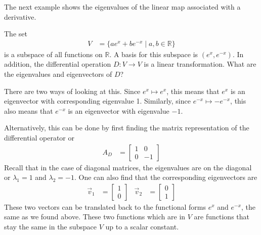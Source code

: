 The next example shows the eigenvalues of the linear map associated with a derivative.  

\begin{example}
The set 
%
\begin{align*}
V & = \{ ae^{x} + b e^{-x} \; | \; a,b \in \mathbb{R} \}
\end{align*}
is a subspace of all functions on $\mathbb{R}$.  A basis for this subspace is $(e^x,e^{-x})$.  In addition, the differential operation $D:V \rightarrow V$ is a linear transformation.   What are the eigenvalues and eigenvectors of $D$?  

\solution

There are two ways of looking at this.  Since $e^{x} \mapsto e^x$, this means that $e^x$ is an eigenvector with corresponding eigenvalue 1.  Similarly, since $e^{-x} \mapsto -e^{-x}$, this also means that $e^{-x}$ is an eigenvector with eigenvalue $-1$.  

Alternatively, this can be done by first finding the matrix representation of the differential operator or
%
\begin{align*}
A_D & = \begin{bmatrix}
1 & 0 \\
0 & -1 
\end{bmatrix}
\end{align*}
Recall that in the case of diagonal matrices, the eigenvalues are on the diagonal or $\lambda_1=1$ and $\lambda_2=-1$.  One can also find that the corresponding eigenvectors are 
%
\begin{align*}
\vec{v}_1 & = \begin{bmatrix}
1 \\ 0 
\end{bmatrix} & \vec{v}_2 & = \begin{bmatrix}
0 \\ 1 
\end{bmatrix}
\end{align*}
These two vectors can be translated back to the functional forms $e^{x}$ and $e^{-x}
$, the same as we found above.  These two functions which are in $V$ are functions that stay the same in the subspace $V$ up to a scalar constant.  


\end{example}

\vspace{2in}

